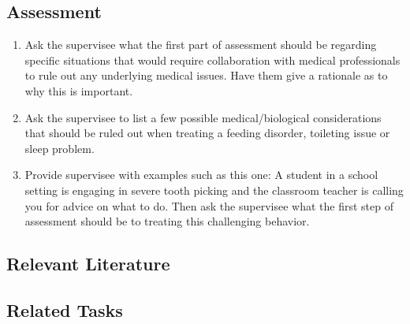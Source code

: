 \subsection{Assessment}
\begin{enumerate}
\item Ask the supervisee what the first part of assessment should be regarding specific situations that would require collaboration with medical professionals to rule out any underlying medical issues. Have them give a rationale as to why this is important. 
\item Ask the supervisee to list a few possible medical/biological considerations that should be ruled out when treating a feeding disorder, toileting issue or sleep problem.
\item Provide supervisee with examples such as this one: A student in a school setting is engaging in severe tooth picking and the classroom teacher is calling you for advice on what to do. Then ask the supervisee what the first step of assessment should be to treating this challenging behavior. 
%
\end{enumerate}
%
\subsection{Relevant Literature}
\begin{refsection}
\nocite{bac2014professional,
        carr2003menstrual,
        carr1995biological,
        cooper2007applied,
        kennedy1996sleep,
        o1997functional,
        skinner1953science,
        ulrich1962reflexive}
\printbibliography[heading=none]
\end{refsection}
%
\subsection{Related Tasks} 
\fourgOne{}\\
\fourgThree{}\\
\fourgSix{}\\
\fourgSeven{}\\
\fourFKThirteen{}\\
\fourFKTwentySix{}\\
